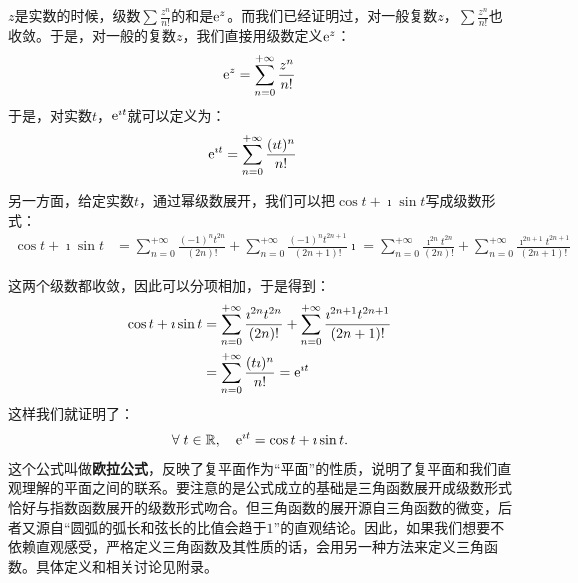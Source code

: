 \documentclass[12pt,UTF8,fontset=none]{ctexbook}
\begin{document}
$z$是实数的时候，级数$\sum \frac{z^{n}}{n!}$的和是$\mathrm{e}^{z}$。而我们已经证明过，对一般复数$z$，$\sum \frac{z^{n}}{n!}$也收敛。于是，对一般的复数$z$，我们直接用级数定义$\mathrm{e}^z$：
$$ \mathrm{e}^{z} = \sum_{n=0}^{+\infty} \frac{z^{n}}{n!} $$
于是，对实数$t$，$\mathrm{e}^{\imath t}$就可以定义为：
\begin{align*}
    \mathrm{e}^{\imath t} &= \sum_{n=0}^{+\infty} \frac{(\imath t)^{n}}{n!}
\end{align*}

另一方面，给定实数$t$，通过幂级数展开，我们可以把$\cos{t} + \imath \sin{t}$写成级数形式：
\begin{align*}
    \cos{t} + \imath \sin{t} &= \sum_{n=0}^{+\infty} \frac{(-1)^nt^{2n}}{(2n)!} + \sum_{n=0}^{+\infty} \frac{(-1)^nt^{2n+1}}{(2n+1)!}\imath = \sum_{n=0}^{+\infty} \frac{\imath^{2n}t^{2n}}{(2n)!} + \sum_{n=0}^{+\infty} \frac{\imath^{2n+1}t^{2n+1}}{(2n+1)!}
\end{align*}

这两个级数都收敛，因此可以分项相加，于是得到：
\begin{align*}
    \cos{t} + \imath \sin{t} &= \sum_{n=0}^{+\infty} \frac{\imath^{2n}t^{2n}}{(2n)!} + \sum_{n=0}^{+\infty} \frac{\imath^{2n+1}t^{2n+1}}{(2n+1)!} \\
    &= \sum_{n=0}^{+\infty} \frac{(t\imath)^{n}}{n!} = \mathrm{e}^{\imath t}
\end{align*}
这样我们就证明了：
$$ \forall \; t\in\mathbb{R}, \quad \mathrm{e}^{\imath t} = \cos{t} + \imath \sin{t}. $$
这个公式叫做\textbf{欧拉公式}，反映了复平面作为“平面”的性质，说明了复平面和我们直观理解的平面之间的联系。要注意的是公式成立的基础是三角函数展开成级数形式恰好与指数函数展开的级数形式吻合。但三角函数的展开源自三角函数的微变，后者又源自“圆弧的弧长和弦长的比值会趋于$1$”的直观结论。因此，如果我们想要不依赖直观感受，严格定义三角函数及其性质的话，会用另一种方法来定义三角函数。具体定义和相关讨论见附录。
\end{document}
